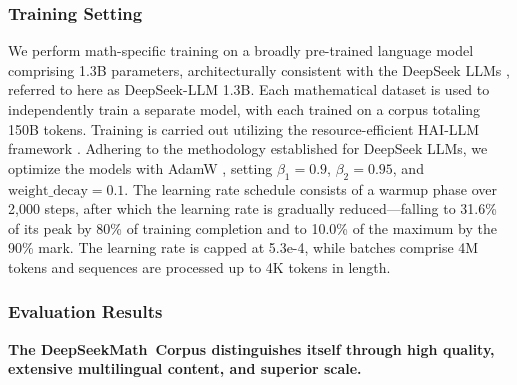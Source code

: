 \subsubsection{Training Setting}
\label{sec:quality-policy}
We perform math-specific training on a broadly pre-trained language model comprising 1.3B parameters, architecturally consistent with the DeepSeek LLMs \citep{deepseek-llm}, referred to here as DeepSeek-LLM 1.3B. Each mathematical dataset is used to independently train a separate model, with each trained on a corpus totaling 150B tokens. Training is carried out utilizing the resource-efficient HAI-LLM framework \citep{haillm}. Adhering to the methodology established for DeepSeek LLMs, we optimize the models with AdamW \citep{adamW}, setting $\beta_1=0.9$, $\beta_2=0.95$, and $\mathrm{weight\_decay}=0.1$. The learning rate schedule consists of a warmup phase over 2,000 steps, after which the learning rate is gradually reduced—falling to 31.6\% of its peak by 80\% of training completion and to 10.0\% of the maximum by the 90\% mark. The learning rate is capped at 5.3e-4, while batches comprise 4M tokens and sequences are processed up to 4K tokens in length.

\subsubsection{Evaluation Results}

\textbf{The DeepSeekMath~Corpus distinguishes itself through high quality, extensive multilingual content, and superior scale.}

